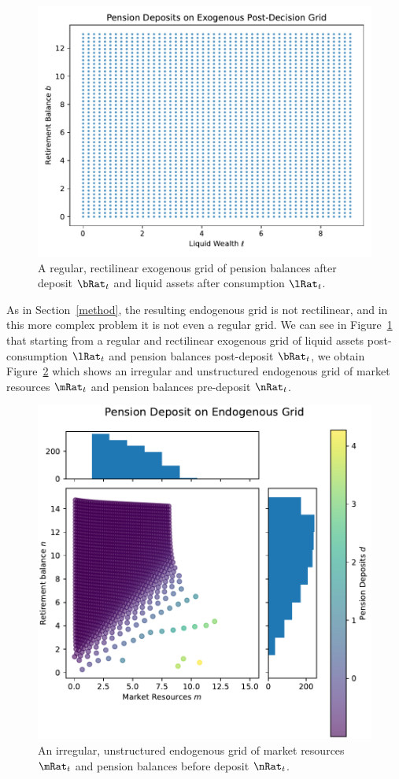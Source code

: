 \documentclass{article}
\begin{document}
\begin{figure}[!htbp]
\centering
\includegraphics[width=0.7\linewidth]{files/SparsePensionExogeno-77d13769f67fb49f8ad1360b2c6e063f.pdf}
\caption[]{A regular, rectilinear exogenous grid of pension balances after deposit $\bRat_{t}$ and liquid assets after consumption $\lRat_{t}$.}
\label{fig:exog}
\end{figure}

As in Section~\ref{method}, the resulting endogenous grid is not rectilinear, and in this more complex problem it is not even a regular grid. We can see in  Figure~\ref{fig:exog} that starting from a regular and rectilinear exogenous grid of liquid assets post-consumption $\lRat_{t}$ and pension balances post-deposit $\bRat_{t}$, we obtain Figure~\ref{fig:endog} which shows an irregular and unstructured endogenous grid of market resources $\mRat_{t}$ and pension balances pre-deposit $\nRat_{t}$.

\begin{figure}[!htbp]
\centering
\includegraphics[width=0.7\linewidth]{files/PensionEndogenousGri-5ac955d146c119517859f410e8c37ef6.pdf}
\caption[]{An irregular, unstructured endogenous grid of market resources $\mRat_{t}$ and pension balances before deposit $\nRat_{t}$.}
\label{fig:endog}
\end{figure}
\end{document}

